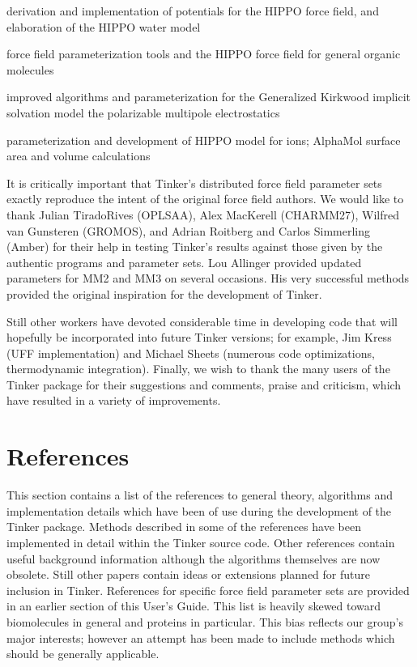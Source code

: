 \documentclass[letterpaper,11pt,english]{sphinxmanual}
\begin{document}
\sphinxAtStartPar
derivation and implementation of potentials for the HIPPO force field, and elaboration of the HIPPO water model

\sphinxAtStartPar
{}

\sphinxAtStartPar
force field parameterization tools and the HIPPO force field for general organic molecules

\sphinxAtStartPar
{}

\sphinxAtStartPar
improved algorithms and parameterization for the Generalized Kirkwood implicit solvation model the polarizable multipole electrostatics

\sphinxAtStartPar
{}

\sphinxAtStartPar
parameterization and development of HIPPO model for ions; AlphaMol surface area and volume calculations

\sphinxAtStartPar
It is critically important that Tinker’s distributed force field parameter sets exactly reproduce the intent of the original force field authors. We would like to thank Julian Tirado\sphinxhyphen{}Rives (OPLS\sphinxhyphen{}AA), Alex MacKerell (CHARMM27), Wilfred van Gunsteren (GROMOS), and Adrian Roitberg and Carlos Simmerling (Amber) for their help in testing Tinker’s results against those given by the authentic programs and parameter sets. Lou Allinger provided updated parameters for MM2 and MM3 on several occasions. His very successful methods provided the original inspiration for the development of Tinker.

\sphinxAtStartPar
Still other workers have devoted considerable time in developing code that will hopefully be incorporated into future Tinker versions; for example, Jim Kress (UFF implementation) and Michael Sheets (numerous code optimizations, thermodynamic integration). Finally, we wish to thank the many users of the Tinker package for their suggestions and comments, praise and criticism, which have resulted in a variety of improvements.

\sphinxstepscope


\chapter{References}
\label{\detokenize{text/references:references}}\label{\detokenize{text/references::doc}}
\sphinxAtStartPar
This section contains a list of the references to general theory, algorithms and implementation details which have been of use during the development of the Tinker package. Methods described in some of the references have been implemented in detail within the Tinker source code. Other references contain useful background information although the algorithms themselves are now obsolete. Still other papers contain ideas or extensions planned for future inclusion in Tinker. References for specific force field parameter sets are provided in an earlier section of this User’s Guide. This list is heavily skewed toward biomolecules in general and proteins in particular. This bias reflects our group’s major interests; however an attempt has been made to include methods which should be generally applicable.
\end{document}

